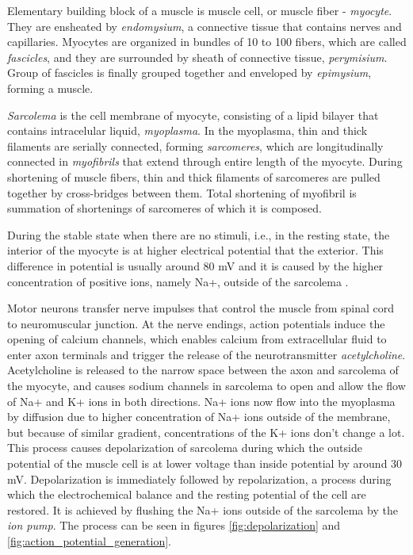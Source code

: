 Elementary building block of a muscle is muscle cell, or muscle fiber - \emph{myocyte}. They are ensheated by \emph{endomysium}, a connective tissue that contains nerves and capillaries. Myocytes are organized in bundles of 10 to 100 fibers, which are called \emph{fascicles}, and they are surrounded by sheath of connective tissue, \emph{perymisium}. Group of fascicles is finally grouped together and enveloped by \emph{epimysium}, forming a muscle.

\emph{Sarcolema} is the cell membrane of myocyte, consisting of a lipid bilayer that contains intracelular liquid, \emph{myoplasma}. In the myoplasma, thin and thick filaments are serially connected, forming \emph{sarcomeres}, which are longitudinally connected in \emph{myofibrils} that extend through entire length of the myocyte. During shortening of muscle fibers, thin and thick filaments of sarcomeres are pulled together by cross-bridges between them. Total shortening of myofibril is summation of shortenings of sarcomeres of which it is composed.

During the stable state when there are no stimuli, i.e., in the resting state, the interior of the myocyte is at higher electrical potential that the exterior. This difference in potential is usually around 80 mV and it is caused by the higher concentration of positive ions, namely Na+, outside of the sarcolema \citep{Nazmi2016}.   


Motor neurons transfer nerve impulses that control the muscle from spinal cord to neuromuscular junction. At the nerve endings, action potentials induce the opening of calcium channels, which enables calcium from extracellular fluid to enter axon terminals and trigger the release of the neurotransmitter \emph{acetylcholine}. Acetylcholine is released to the narrow space between the axon and sarcolema of the myocyte, and causes sodium channels in sarcolema to open and allow the flow of Na+ and K+ ions in both directions. Na+ ions now flow into the myoplasma by diffusion due to higher concentration of Na+ ions outside of the membrane, but because of similar gradient, concentrations of the K+ ions don't change a lot. This process causes depolarization of sarcolema during which the outside potential of the muscle cell is at lower voltage than inside potential by around 30 mV. Depolarization is immediately followed by repolarization, a process during which the electrochemical balance and the resting potential of the cell are restored. It is achieved by flushing the Na+ ions outside of the sarcolema by the \emph{ion pump}. The process can be seen in figures \ref{fig:depolarization} and \ref{fig:action_potential_generation}.
  
